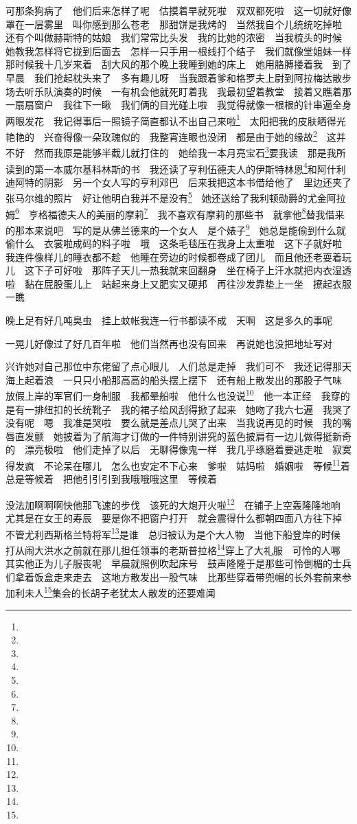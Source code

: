 \par 可那条狗病了　他们后来怎样了呢　估摸着早就死啦　双双都死啦　这一切就好像罩在一层雾里　叫你感到那么苍老　那甜饼是我烤的　当然我自个儿统统吃掉啦　还有个叫做赫斯特的姑娘　我们常常比头发　我的比她的浓密　当我梳头的时候　她教我怎样将它拢到后面去　怎样一只手用一根线打个结子　我们就像堂姐妹一样　那时候我十几岁来着　刮大风的那个晚上我睡到她的床上　她用胳膊搂着我　到了早晨　我们抢起枕头来了　多有趣儿呀　当我跟着爹和格罗夫上尉到阿拉梅达散步场去听乐队演奏的时候　一有机会他就死盯着我　我最初望着教堂　接着又瞧着那一扇扇窗户　我往下一瞅　我们俩的目光碰上啦　我觉得就像一根根的针串遍全身　两眼发花　我记得事后一照镜子简直都认不出自己来啦\footnote{}　太阳把我的皮肤晒得光艳艳的　兴奋得像一朵玫瑰似的　我整宵连眼也没闭　都是由于她的缘故\footnote{}　这并不好　然而我原是能够半截儿就打住的　她给我一本月亮宝石\footnote{}要我读　那是我所读到的第一本威尔基科林斯的书　我还读了亨利伍德夫人的伊斯特林恩\footnote{}和阿什利迪阿特的阴影　另一个女人写的亨利邓巴　后来我把这本书借给他了　里边还夹了张马尔维的照片　好让他明白我并不是没有\footnote{}　她还送给了我利顿勋爵的尤金阿拉姆\footnote{}　亨格福德夫人的美丽的摩莉\footnote{}　我不喜欢有摩莉的那些书　就拿他\footnote{}替我借来的那本来说吧　写的是从佛兰德来的一个女人　是个婊子\footnote{}　她总是能偷到什么就偷什么　衣裳啦成码的料子啦　哦　这条毛毯压在我身上太重啦　这下子就好啦　我连件像样儿的睡衣都不趁　他睡在旁边的时候都卷成了团儿　而且他还老耍着玩儿　这下子可好啦　那阵子天儿一热我就来回翻身　坐在椅子上汗水就把内衣湿透啦　黏在屁股蛋儿上　站起来身上又肥实又硬邦　再往沙发靠垫上一坐　撩起衣服一瞧　
\par 晚上足有好几吨臭虫　挂上蚊帐我连一行书都读不成　天啊　这是多久的事呢　
\par 一晃儿好像过了好几百年啦　他们当然再也没有回来　再说她也没把地址写对　
\par 兴许她对自己那位中东佬留了点心眼儿　人们总是走掉　我们可不　我还记得那天海上起着浪　一只只小船那高高的船头摆上摆下　还有船上散发出的那股子气味　放假上岸的军官们一身制服　我都晕船啦　他什么也没说\footnote{}　他一本正经　我穿的是有一排纽扣的长统靴子　我的裙子给风刮得掀了起来　她吻了我六七遍　我哭了没有呢　嗯　我准是哭啦　要么就是差点儿哭了出来　当我说再见的时候　我的嘴唇直发颤　她披着为了航海才订做的一件特别讲究的蓝色披肩有一边儿做得挺新奇的　漂亮极啦　他们走掉了以后　无聊得像鬼一样　我几乎琢磨着要逃走啦　寂寞得发疯　不论呆在哪儿　怎么也安定不下心来　爹啦　姑妈啦　婚姻啦　等候\footnote{}着　总是等候着　把他引引引到我哦哦哦这里　等候着　
\par 没法加啊啊啊快他那飞速的步伐　该死的大炮开火啦\footnote{}　在铺子上空轰隆隆地响　尤其是在女王的寿辰　要是你不把窗户打开　就会震得什么都朝四面八方往下掉　不管尤利西斯格兰特将军\footnote{}是谁　总归被认为是个大人物　当他下船登岸的时候　打从闹大洪水之前就在那儿担任领事的老斯普拉格\footnote{}穿上了大礼服　可怜的人哪　其实他正为儿子服丧呢　早晨就照例吹起床号　鼓声隆隆于是那些可怜倒楣的士兵们拿着饭盒走来走去　这地方散发出一股气味　比那些穿着带兜帽的长外套前来参加利未人\footnote{}集会的长胡子老犹太人散发的还要难闻　
